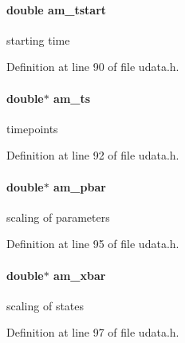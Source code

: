 \hypertarget{struct_user_data_a230439d483e6fde07a6fe687219060c2}{}
\paragraph[{am\+\_\+tstart}]{\setlength{\rightskip}{0pt plus 5cm}double am\+\_\+tstart}\label{struct_user_data_a230439d483e6fde07a6fe687219060c2}
starting time 

Definition at line 90 of file udata.\+h.

\hypertarget{struct_user_data_a368434a79bdb1655bef3adc552834ddc}{}
\paragraph[{am\+\_\+ts}]{\setlength{\rightskip}{0pt plus 5cm}double$\ast$ am\+\_\+ts}\label{struct_user_data_a368434a79bdb1655bef3adc552834ddc}
timepoints 

Definition at line 92 of file udata.\+h.

\hypertarget{struct_user_data_aa73d75cc02e28bcdf108cbea53e615e9}{}
\paragraph[{am\+\_\+pbar}]{\setlength{\rightskip}{0pt plus 5cm}double$\ast$ am\+\_\+pbar}\label{struct_user_data_aa73d75cc02e28bcdf108cbea53e615e9}
scaling of parameters 

Definition at line 95 of file udata.\+h.

\hypertarget{struct_user_data_ad21f2b82715b051daf2775ed059afdbb}{}
\paragraph[{am\+\_\+xbar}]{\setlength{\rightskip}{0pt plus 5cm}double$\ast$ am\+\_\+xbar}\label{struct_user_data_ad21f2b82715b051daf2775ed059afdbb}
scaling of states 

Definition at line 97 of file udata.\+h.

\hypertarget{struct_user_data_ab62bd78b1593ddbf3d854356b4dcaa0f}{}
